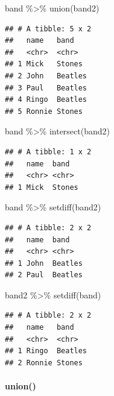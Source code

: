 \documentclass[
]{article}
\newenvironment{Shaded}{\begin{snugshade}}{\end{snugshade}}
\newcommand{\FunctionTok}[1]{\textcolor[rgb]{0.00,0.00,0.00}{#1}}
\newcommand{\NormalTok}[1]{#1}
\newcommand{\SpecialCharTok}[1]{\textcolor[rgb]{0.00,0.00,0.00}{#1}}
\begin{document}
\begin{Shaded}
\begin{Highlighting}[]
\NormalTok{band }\SpecialCharTok{\%\textgreater{}\%} \FunctionTok{union}\NormalTok{(band2)}
\end{Highlighting}
\end{Shaded}

\begin{verbatim}
## # A tibble: 5 x 2
##   name   band   
##   <chr>  <chr>  
## 1 Mick   Stones 
## 2 John   Beatles
## 3 Paul   Beatles
## 4 Ringo  Beatles
## 5 Ronnie Stones
\end{verbatim}

\begin{Shaded}
\begin{Highlighting}[]
\NormalTok{band }\SpecialCharTok{\%\textgreater{}\%} \FunctionTok{intersect}\NormalTok{(band2)}
\end{Highlighting}
\end{Shaded}

\begin{verbatim}
## # A tibble: 1 x 2
##   name  band  
##   <chr> <chr> 
## 1 Mick  Stones
\end{verbatim}

\begin{Shaded}
\begin{Highlighting}[]
\NormalTok{band }\SpecialCharTok{\%\textgreater{}\%} \FunctionTok{setdiff}\NormalTok{(band2)}
\end{Highlighting}
\end{Shaded}

\begin{verbatim}
## # A tibble: 2 x 2
##   name  band   
##   <chr> <chr>  
## 1 John  Beatles
## 2 Paul  Beatles
\end{verbatim}

\begin{Shaded}
\begin{Highlighting}[]
\NormalTok{band2 }\SpecialCharTok{\%\textgreater{}\%} \FunctionTok{setdiff}\NormalTok{(band)}
\end{Highlighting}
\end{Shaded}

\begin{verbatim}
## # A tibble: 2 x 2
##   name   band   
##   <chr>  <chr>  
## 1 Ringo  Beatles
## 2 Ronnie Stones
\end{verbatim}

\hypertarget{union}{%
\paragraph{union()}\label{union}}
\end{document}
